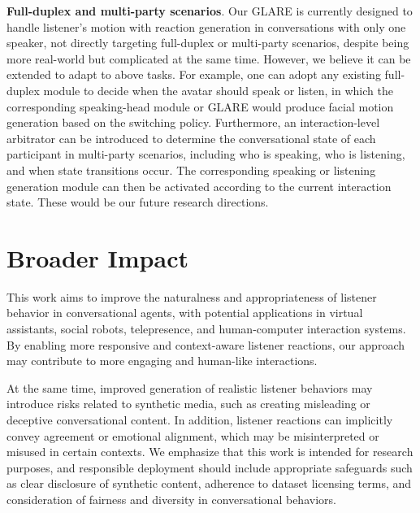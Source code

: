 \textbf{Full-duplex and multi-party scenarios}. Our GLARE is currently designed to handle listener's motion with reaction generation in conversations with only one speaker, not directly targeting full-duplex or multi-party scenarios, despite being more real-world but complicated at the same time. However, we believe it can be extended to adapt to above tasks. For example, one can adopt any existing full-duplex module to decide when the avatar should speak or listen, in which the corresponding speaking-head module or GLARE would produce facial motion generation based on the switching policy. Furthermore, an interaction-level arbitrator can be introduced to determine the conversational state of each participant in multi-party scenarios, including who is speaking, who is listening, and when state transitions occur. The corresponding speaking or listening generation module can then be activated according to the current interaction state. These would be our future research directions.


\section{Broader Impact}  \label{app:broader_impact}

This work aims to improve the naturalness and appropriateness of listener behavior in conversational agents, with potential applications in virtual assistants, social robots, telepresence, and human-computer interaction systems. By enabling more responsive and context-aware listener reactions, our approach may contribute to more engaging and human-like interactions.

At the same time, improved generation of realistic listener behaviors may introduce risks related to synthetic media, such as creating misleading or deceptive conversational content. In addition, listener reactions can implicitly convey agreement or emotional alignment, which may be misinterpreted or misused in certain contexts. We emphasize that this work is intended for research purposes, and responsible deployment should include appropriate safeguards such as clear disclosure of synthetic content, adherence to dataset licensing terms, and consideration of fairness and diversity in conversational behaviors.